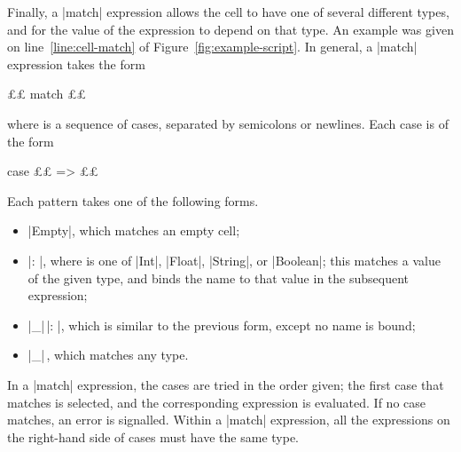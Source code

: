 Finally, a |match| expression allows the cell to have one of several different
types, and for the value of the expression to depend on that type.  An example
was given on line~\ref{line:cell-match} of Figure~\ref{fig:example-script}.
In general, a |match| expression takes the form
\begin{scala}
  ££ match{ ££ } 
\end{scala}
where  is a sequence of cases, separated by semicolons or
newlines.  Each case is of the form
\begin{scala}
  case ££ => ££
\end{scala}
%
Each pattern takes one of the following forms.
\begin{itemize}
\item |Empty|, which matches an empty cell;

\item {}|: |, where  is one of |Int|,
  |Float|, |String|, or |Boolean|; this matches a value of the given type, and
  binds the name to that value in the subsequent expression;
 
\item |_|\,|: |, which is similar to the previous form, except no
  name is bound;

\item |_|\,, which matches any type.
\end{itemize}
%
In a |match| expression, the cases are tried in the order given; the first
case that matches is selected, and the corresponding expression is evaluated.
If no case matches, an error is signalled.  Within a |match| expression, all
the expressions on the right-hand side of cases must have the same type.  

